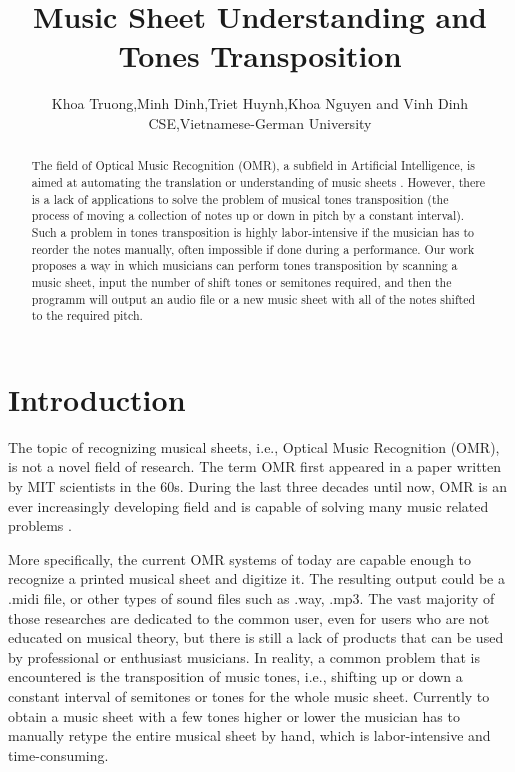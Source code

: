 \documentclass[final]{cvpr}
\begin{document}
\title{Music Sheet Understanding and Tones Transposition}

\author{Khoa Truong,Minh Dinh,Triet Huynh,Khoa Nguyen and Vinh Dinh\\
         CSE,Vietnamese-German University}  


\maketitle


\begin{abstract}
The field of Optical Music Recognition (OMR), a subfield in Artificial
Intelligence, is aimed at automating the translation or understanding of music
sheets \cite{Calvo-Zaragoza}.  However, there is a lack of applications to solve
the problem of musical tones transposition (the process of moving a collection
of notes up or down in pitch by a constant interval).  Such a problem in tones
transposition is highly labor-intensive if the musician has to reorder the notes
manually, often impossible if done during a performance. Our work proposes a way
in which musicians can perform tones transposition by scanning a music sheet,
input the number of shift tones or semitones required, and then the programm
will output an audio file or a new music sheet with all of the notes shifted to
the required pitch. 
\end{abstract}

\section{Introduction}
The topic of recognizing musical sheets, i.e., Optical Music Recognition (OMR),
is not a novel field of research. The term OMR first appeared in a paper written
by MIT scientists in the 60s.  During the last three decades until now, OMR is
an ever increasingly developing field and is capable of solving many music related
problems \cite{Shatri2020a}.

More specifically, the current OMR systems of today are capable enough to
recognize a printed musical sheet and digitize it. The resulting output could be
a .midi file, or other types of sound files such as .way, .mp3. The vast
majority of those researches are dedicated to the common user, even for users
who are not educated on musical theory, but there is still a lack of products
that can be used by professional or enthusiast musicians. In reality, a common
problem that is encountered is the transposition of music tones, i.e., shifting up or down a constant interval of
semitones or tones for the whole music sheet. Currently to obtain a music
sheet with a few tones higher or lower the musician has to manually retype the
entire musical sheet by hand, which is labor-intensive and time-consuming.
\end{document}
